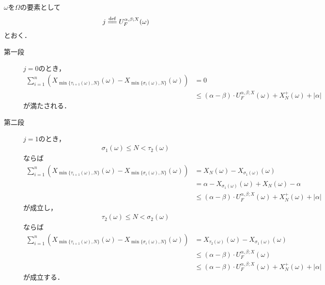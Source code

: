  	\begin{sketch}
 		$\omega$を$\Omega$の要素として
 		\begin{align}
 			j \defeq U_F^{\alpha,\beta;X}(\omega)
 		\end{align}
 		とおく．
 		\begin{description}
 			\item[第一段]
 				$j = 0$のとき，
 				\begin{align}
 					\sum_{i=1}^n \left( X_{\min{}{\{\tau_{i+1}(\omega),N\}}}(\omega) - X_{\min{}{\{\sigma_i(\omega),N\}}}(\omega) \right)
	 				&= 0 \\
	 				&\leq (\alpha - \beta) \cdot U_F^{\alpha,\beta;X}(\omega) + X_N^+(\omega) + |\alpha|
	 			\end{align}
	 			が満たされる．
	 		
	 		\item[第二段]
	 			$j = 1$のとき，
	 			\begin{align}
	 				\sigma_1(\omega) \leq N < \tau_2(\omega)
	 			\end{align}
	 			ならば
	 			\begin{align}
	 				\sum_{i=1}^n \left( X_{\min{}{\{\tau_{i+1}(\omega),N\}}}(\omega) - X_{\min{}{\{\sigma_i(\omega),N\}}}(\omega) \right)
	 				&= X_N(\omega) - X_{\sigma_1(\omega)}(\omega) \\
	 				&= \alpha - X_{\sigma_1(\omega)}(\omega) + X_N(\omega) - \alpha \\
	 				&\leq (\alpha - \beta) \cdot U_F^{\alpha,\beta;X}(\omega) + X_N^+(\omega) + |\alpha|
	 			\end{align}
	 			が成立し，
	 			\begin{align}
	 				\tau_2(\omega) \leq N < \sigma_2(\omega)
	 			\end{align}
	 			ならば
	 			\begin{align}
	 				\sum_{i=1}^n \left( X_{\min{}{\{\tau_{i+1}(\omega),N\}}}(\omega) - X_{\min{}{\{\sigma_i(\omega),N\}}}(\omega) \right)
 					&= X_{\tau_2(\omega)}(\omega) - X_{\sigma_1(\omega)}(\omega) \\
 					&\leq (\alpha - \beta) \cdot U_F^{\alpha,\beta;X}(\omega) \\
 					&\leq (\alpha - \beta) \cdot U_F^{\alpha,\beta;X}(\omega) + X_N^+(\omega) + |\alpha|
 				\end{align}
 				が成立する．
 			

\end{description}
\end{sketch}
